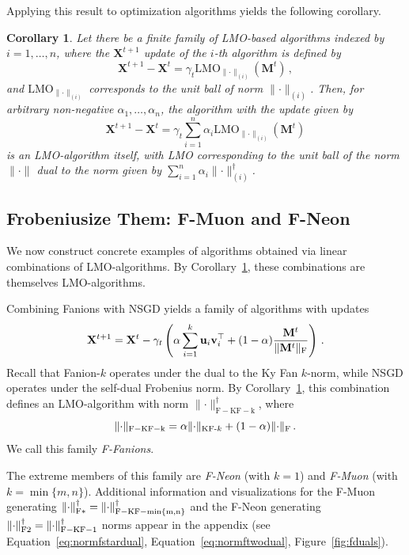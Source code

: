 \documentclass[a4paper,14pt,oneside]{extarticle}
\newtheorem*{corollary}{Corollary}
\newcommand{\norm}[1]{\lVert #1\rVert}
\DeclarePairedDelimiter{\normf}{\|}{\|_\mathrm{F}}
\DeclarePairedDelimiter{\normkfk}{\|}{\|_{\text{KF-}k}}
\DeclarePairedDelimiter{\normfstar}{\|}{\|_\mathrm{F*}}
\DeclarePairedDelimiter{\normftwo}{\|}{\|_\mathrm{F2}}
\newcommand{\vu}{\mathbf{u}}
\newcommand{\vv}{\mathbf{v}}
\newcommand{\mX}{\mathbf{X}}
\newcommand{\mM}{\mathbf{M}}
\newcommand{\figureref}[1]{Figure~\ref{#1}}
\newcommand{\equationref}[1]{Equation~\ref{#1}}
\newcommand{\corollaryref}[1]{Corollary~\ref{#1}}
\begin{document}
Applying this result to optimization algorithms yields the following corollary.

\begin{corollary}\label{corollary:lin_comb_alg}
  Let there be a finite family of LMO-based algorithms indexed by $i = 1, \dots, n$, where the $\mX^{t + 1}$ update of the $i$-th algorithm is defined by
  \[
  \mX^{t + 1} - \mX^{t} = \gamma_t \mathrm{LMO}_{\norm{\cdot}_{(i)}}(\mM^{t})\,,
  \]
  and $\mathrm{LMO}_{\norm{\cdot}_{(i)}}$ corresponds to the unit ball of norm $\norm{\cdot}_{(i)}$. Then, for arbitrary non-negative $\alpha_1, \dots, \alpha_n$, the algorithm with the update given by
  \[
  \mX^{t + 1} - \mX^{t} = \gamma_t \sum_{i = 1}^n \alpha_i \mathrm{LMO}_{\norm{\cdot}_{(i)}}(\mM^t)
  \]
  is an LMO-algorithm itself, with LMO corresponding to the unit ball of the norm $\norm{\cdot}$ dual to the norm given by $\sum_{i = 1}^n \alpha_i \norm{\cdot}_{(i)}^\dagger$.
\end{corollary}

\subsection{Frobeniusize Them: F-Muon and F-Neon}
We now construct concrete examples of algorithms obtained via linear combinations of LMO-algorithms. By \corollaryref{corollary:lin_comb_alg}, these combinations are themselves LMO-algorithms.

Combining Fanions with NSGD yields a family of algorithms with updates
\begin{equation}\label{eq:nsgd_muon_update}
    \mX^{t+1} = \mX^{t} - \gamma_t \left(\alpha \sum_{i = 1}^k \vu_i \vv_i^\top + (1-\alpha)\frac{\mM^t}{\normf{\mM^t}}\right)\,.
\end{equation}
Recall that Fanion-$k$ operates under the dual to the Ky Fan $k$-norm, while NSGD operates under the self-dual Frobenius norm. By \corollaryref{corollary:lin_comb_alg}, this combination defines an LMO-algorithm with norm $\norm{\cdot}_{\mathrm{F-KF-k}}^\dagger$, where
\begin{equation}\label{eq:fkfk_norm}
  \norm{\cdot}_{\mathrm{F-KF-k}} = \alpha \normkfk{\cdot} + (1-\alpha)\normf{\cdot}\,.
\end{equation}
We call this family \emph{F-Fanions}.

The extreme members of this family are \emph{F-Neon} (with $k = 1$) and \emph{F-Muon} (with $k = \min\{m, n\}$). Additional information and visualizations for the F-Muon generating $\normfstar{\cdot}^\dagger = \norm{\cdot}_{\mathrm{F-KF-\min\{m, n\}}}^\dagger$ and the F-Neon generating $\normftwo{\cdot}^\dagger = \norm{\cdot}_{\mathrm{F-KF-1}}^\dagger$ norms appear in the appendix (see \equationref{eq:normfstardual}, \equationref{eq:normftwodual}, \figureref{fig:fduals}).
\end{document}
